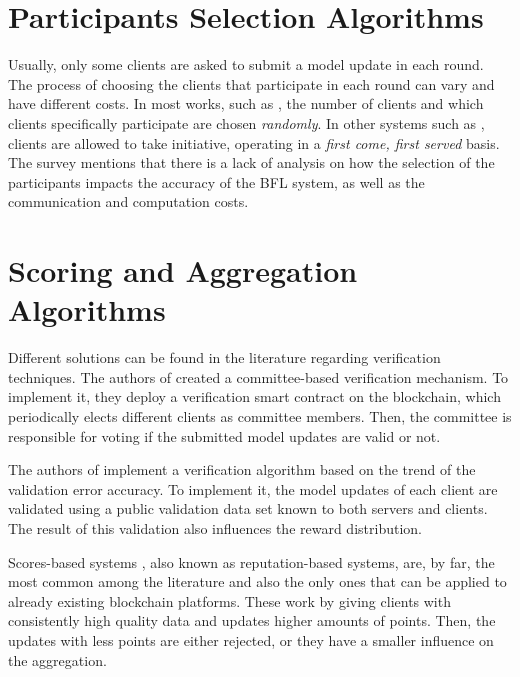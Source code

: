 \section{Participants Selection Algorithms}\label{related_work:participants_selection}

Usually, only some clients are asked to submit a model update in each round. The process of choosing the clients that participate in each round can vary and have different costs. In most works, such as \cite{Peyvandi2022, demo, 9293091}, the number of clients and which clients specifically participate are chosen \textit{randomly}. In other systems such as \cite{9184854, FANG20221}, clients are allowed to take initiative, operating in a \textit{first come, first served} basis. The survey \cite{9403374} mentions that there is a lack of analysis on how the selection of the participants impacts the accuracy of the BFL system, as well as the communication and computation costs.

\section{Scoring and Aggregation Algorithms}\label{related_work:scoring_techniques}

Different solutions can be found in the literature regarding verification techniques. The authors of \cite{9159643} created a committee-based verification mechanism. To implement it, they deploy a verification smart contract on the blockchain, which periodically elects different clients as committee members. Then, the committee is responsible for voting if the submitted model updates are valid or not.

The authors of \cite{8945913} implement a verification algorithm based on the trend of the validation error accuracy. To implement it, the model updates of each client are validated using a public validation data set known to both servers and clients. The result of this validation also influences the reward distribution.

Scores-based systems \cite{10.48550/arxiv.2011.07516, 9170559, Peyvandi2022, 9292450}, also known as reputation-based systems, are, by far, the most common among the literature and also the only ones that can be applied to already existing blockchain platforms. These work by giving clients with consistently high quality data and updates higher amounts of points. Then, the updates with less points are either rejected, or they have a smaller influence on the aggregation.

